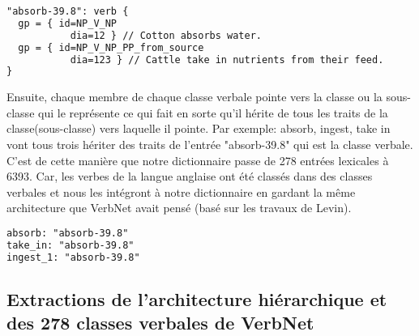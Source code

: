 \begin{lstlisting}[language=XML]
"absorb-39.8": verb {
  gp = { id=NP_V_NP  
	       dia=12 } // Cotton absorbs water.
  gp = { id=NP_V_NP_PP_from_source  
	       dia=123 } // Cattle take in nutrients from their feed.
}
\end{lstlisting}

Ensuite, chaque membre de chaque classe verbale pointe vers la classe ou la sous-classe qui le représente ce qui fait en sorte qu'il hérite de tous les traits de la classe(sous-classe) vers laquelle il pointe. Par exemple: absorb, ingest, take in vont tous trois hériter des traits de l'entrée "absorb-39.8" qui est la classe verbale. C'est de cette manière que notre dictionnaire passe de 278 entrées lexicales à 6393. Car, les verbes de la langue anglaise ont été classés dans des classes verbales et nous les intégront à notre dictionnaire en gardant la même architecture que VerbNet avait pensé (basé sur les travaux de Levin).

\begin{lstlisting}[language=XML]
absorb: "absorb-39.8"
take_in: "absorb-39.8"
ingest_1: "absorb-39.8"
\end{lstlisting}

\subsection{Extractions de l'architecture hiérarchique et des 278 classes verbales de VerbNet}

